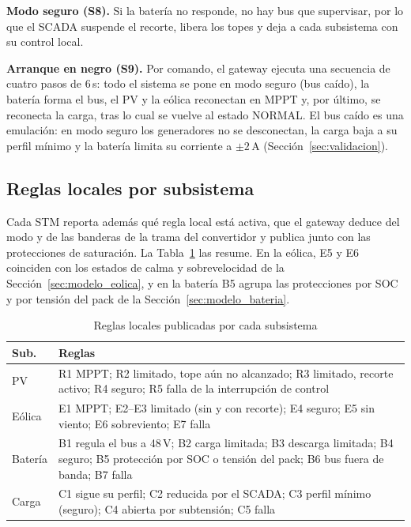 \documentclass[conference]{IEEEtran}
\begin{document}
\textbf{Modo seguro (S8).} Si la batería no responde, no hay bus que supervisar, por lo que el SCADA suspende el recorte, libera los topes y deja a cada subsistema con su control local.

\textbf{Arranque en negro (S9).} Por comando, el gateway ejecuta una secuencia de cuatro pasos de 6\,s: todo el sistema se pone en modo seguro (bus caído), la batería forma el bus, el PV y la eólica reconectan en MPPT y, por último, se reconecta la carga, tras lo cual se vuelve al estado NORMAL. El bus caído es una emulación: en modo seguro los generadores no se desconectan, la carga baja a su perfil mínimo y la batería limita su corriente a $\pm2$\,A (Sección~\ref{sec:validacion}).

\subsection{Reglas locales por subsistema}

Cada STM reporta además qué regla local está activa, que el gateway deduce del modo y de las banderas de la trama del convertidor y publica junto con las protecciones de saturación. La Tabla~\ref{tab:reglas_locales} las resume. En la eólica, E5 y E6 coinciden con los estados de calma y sobrevelocidad de la Sección~\ref{sec:modelo_eolica}, y en la batería B5 agrupa las protecciones por SOC y por tensión del pack de la Sección~\ref{sec:modelo_bateria}.

\begin{table}[H]
\caption{Reglas locales publicadas por cada subsistema}
\label{tab:reglas_locales}
\centering
\scriptsize\setlength{\tabcolsep}{3pt}
\begin{tabular}{|l|p{6.0cm}|}
\hline
\textbf{Sub.} & \textbf{Reglas} \\
\hline
PV & R1 MPPT; R2 limitado, tope aún no alcanzado; R3 limitado, recorte activo; R4 seguro; R5 falla de la interrupción de control \\ \hline
Eólica & E1 MPPT; E2--E3 limitado (sin y con recorte); E4 seguro; E5 sin viento; E6 sobreviento; E7 falla \\ \hline
Batería & B1 regula el bus a 48\,V; B2 carga limitada; B3 descarga limitada; B4 seguro; B5 protección por SOC o tensión del pack; B6 bus fuera de banda; B7 falla \\ \hline
Carga & C1 sigue su perfil; C2 reducida por el SCADA; C3 perfil mínimo (seguro); C4 abierta por subtensión; C5 falla \\ \hline
\end{tabular}
\end{table}
\end{document}
